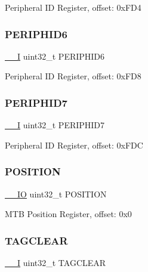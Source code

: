 Peripheral ID Register, offset\+: 0x\+F\+D4 \mbox{\label{struct_m_t_b___type_acd8505982b40f4478a3d82c4e0c884b4}} 
\subsubsection{\texorpdfstring{PERIPHID6}{PERIPHID6}}
{\footnotesize\ttfamily \mbox{\hyperlink{core__cm0plus_8h_af63697ed9952cc71e1225efe205f6cd3}{\+\_\+\+\_\+I}} uint32\+\_\+t P\+E\+R\+I\+P\+H\+I\+D6}

Peripheral ID Register, offset\+: 0x\+F\+D8 \mbox{\label{struct_m_t_b___type_ace00880bb4cdd91134d59cd85324c681}} 
\subsubsection{\texorpdfstring{PERIPHID7}{PERIPHID7}}
{\footnotesize\ttfamily \mbox{\hyperlink{core__cm0plus_8h_af63697ed9952cc71e1225efe205f6cd3}{\+\_\+\+\_\+I}} uint32\+\_\+t P\+E\+R\+I\+P\+H\+I\+D7}

Peripheral ID Register, offset\+: 0x\+F\+DC \mbox{\label{struct_m_t_b___type_aacfec5feeacac6c5b12fd2eef4fcd197}} 
\subsubsection{\texorpdfstring{POSITION}{POSITION}}
{\footnotesize\ttfamily \mbox{\hyperlink{core__cm0plus_8h_aec43007d9998a0a0e01faede4133d6be}{\+\_\+\+\_\+\+IO}} uint32\+\_\+t P\+O\+S\+I\+T\+I\+ON}

M\+TB Position Register, offset\+: 0x0 \mbox{\label{struct_m_t_b___type_a76d0489a678cfb330980a27aa5c561ce}} 
\subsubsection{\texorpdfstring{TAGCLEAR}{TAGCLEAR}}
{\footnotesize\ttfamily \mbox{\hyperlink{core__cm0plus_8h_af63697ed9952cc71e1225efe205f6cd3}{\+\_\+\+\_\+I}} uint32\+\_\+t T\+A\+G\+C\+L\+E\+AR}

